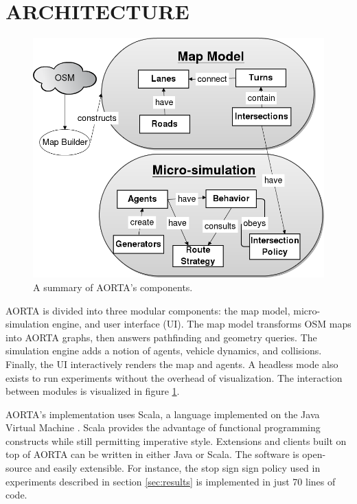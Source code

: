 \documentclass[letterpaper, 10 pt, conference]{ieeeconf}  %
\begin{document}
\section{ARCHITECTURE}
\label{sec:arch}

\begin{figure}
  \centering \includegraphics[scale=0.3]{architecture.png}
  \caption{A summary of AORTA's components.}
  \label{fig:arch}
  \vspace{-15pt}
\end{figure}

AORTA is divided into three modular components: the map model, micro-simulation
engine, and user interface (UI). The map model transforms OSM maps into AORTA
graphs, then answers pathfinding and geometry queries. The simulation engine
adds a notion of agents, vehicle dynamics, and collisions. Finally, the UI
interactively renders the map and agents. A headless mode also exists to run
experiments without the overhead of visualization. The interaction between
modules is visualized in figure \ref{fig:arch}.

AORTA's implementation uses Scala, a language implemented on the Java Virtual
Machine \cite{scala}. Scala provides the advantage of functional programming
constructs while still permitting imperative style.  Extensions and clients
built on top of AORTA can be written in either Java or Scala. The software is
open-source and easily extensible. For instance, the stop sign sign policy used
in experiments described in section \ref{sec:results} is implemented in just 70
lines of code. 
\end{document}
